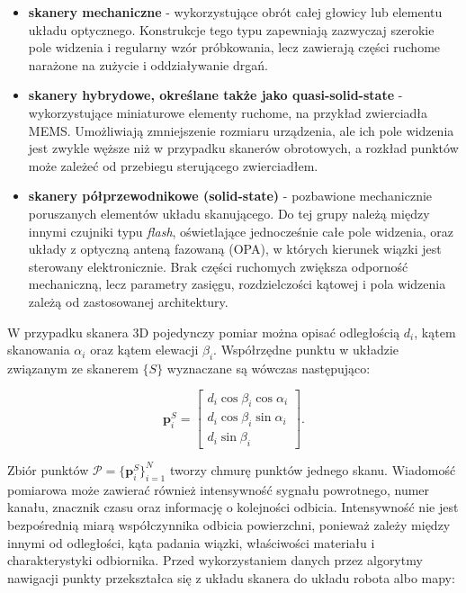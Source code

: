 \documentclass[a4paper,twoside,12pt]{book}
\begin{document}
\begin{itemize}
    \item \textbf{skanery mechaniczne} - wykorzystujące obrót całej głowicy lub elementu układu optycznego. Konstrukcje tego typu zapewniają zazwyczaj szerokie pole widzenia i regularny wzór próbkowania, lecz zawierają części ruchome narażone na zużycie i oddziaływanie drgań.
    \item \textbf{skanery hybrydowe, określane także jako quasi-solid-state} - wykorzystujące miniaturowe elementy ruchome, na przykład zwierciadła MEMS. Umożliwiają zmniejszenie rozmiaru urządzenia, ale ich pole widzenia jest zwykle węższe niż w przypadku skanerów obrotowych, a rozkład punktów może zależeć od przebiegu sterującego zwierciadłem.
    \item \textbf{skanery półprzewodnikowe (solid-state)} - pozbawione mechanicznie poruszanych elementów układu skanującego. Do tej grupy należą między innymi czujniki typu \textit{flash}, oświetlające jednocześnie całe pole widzenia, oraz układy z optyczną anteną fazowaną (OPA), w których kierunek wiązki jest sterowany elektronicznie. Brak części ruchomych zwiększa odporność mechaniczną, lecz parametry zasięgu, rozdzielczości kątowej i pola widzenia zależą od zastosowanej architektury.
\end{itemize}

W przypadku skanera 3D pojedynczy pomiar można opisać odległością $d_i$, kątem skanowania $\alpha_i$ oraz kątem elewacji $\beta_i$. Współrzędne punktu w układzie związanym ze skanerem $\{S\}$ wyznaczane są wówczas następująco:

\begin{equation}
    \mathbf{p}^{S}_i =
    \begin{bmatrix}
        d_i\cos\beta_i\cos\alpha_i \\
        d_i\cos\beta_i\sin\alpha_i \\
        d_i\sin\beta_i
    \end{bmatrix}.
    \label{eq:lidar_spherical_to_cartesian}
\end{equation}

Zbiór punktów $\mathcal{P}=\{\mathbf{p}^{S}_i\}_{i=1}^{N}$ tworzy chmurę punktów jednego skanu. Wiadomość pomiarowa może zawierać również intensywność sygnału powrotnego, numer kanału, znacznik czasu oraz informację o kolejności odbicia. Intensywność nie jest bezpośrednią miarą współczynnika odbicia powierzchni, ponieważ zależy między innymi od odległości, kąta padania wiązki, właściwości materiału i charakterystyki odbiornika. Przed wykorzystaniem danych przez algorytmy nawigacji punkty przekształca się z układu skanera do układu robota albo mapy:
\end{document}
